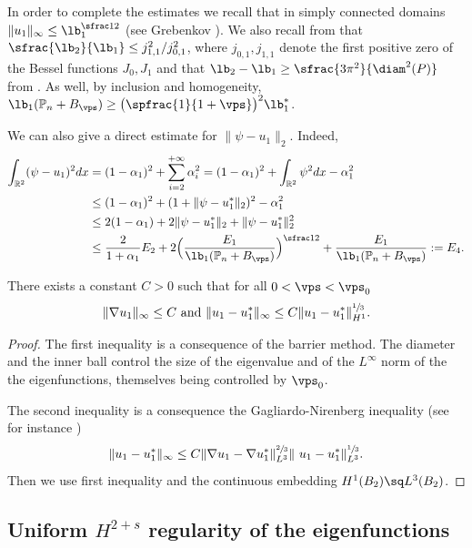 \begin{rem}
In order to complete the estimates we recall that in simply connected domains $\|u_1\|_\infty \le \lb_1^{\sfrac 12}$ (see Grebenkov \cite[For.\,(6.22)]{GrNg13}). We also recall from \cite{AsBe92} that $\sfrac{\lb_2 }{ \lb _1} \le j_{1,1}^2/j_{0,1}^2$, where $j_{0,1}, j_{1,1}$ denote the first positive zero of the Bessel functions $J_0, J_1$ and that $\lb_2-\lb_1\ge \sfrac{3\pi^2}{\diam^2 (P)}$ from \cite{AnCl11}.
As well, by inclusion and homogeneity, $\lb_1(\Bbb{P}_n+ B_\vps) \ge \big (\spfrac{1}{1+\vps} \big)^2 \lb_1^*$.

We can also give a direct estimate for $\|\psi -u_1 \|_2$. Indeed,
\begin{align*}
\int_{\Bbb{R}^2} (\psi -u_1)^2 dx &= (1-\alpha_1)^2+ \sum_{i=2}^{+\infty} \alpha_i^2= (1-\alpha_1)^2+ \int_{\Bbb{R}^2} \psi^2 dx -\alpha_1^2
\\
&\le (1-\alpha_1)^2+(1+ \|\psi -u_1^*\|_2)^2 -\alpha_1^2
\\
&\le 2(1-\alpha_1)+ 2 \|\psi -u_1^*\|_2 + \|\psi -u_1^*\|_2^2
\\
&\le \frac{2}{1+\alpha_1} E_2+ 2\Bigl(\frac{E_1}{\lb_1(\Bbb{P}_n+ B_\vps)}\Bigr)^{\sfrac12}+\frac{E_1}{\lb_1(\Bbb{P}_n+ B_\vps)}:=E_4.
\end{align*}
\end{rem}

\begin{propo}\label{bobu16}
There exists a constant $C>0$ such that for all $0<\vps<\vps _0$
\[
\|\nabla u_1\|_\infty \le C \text{ and }\|u_1-u_1^*\|_\infty \le C \|u_1-u_1^*\|_{H^1}^{\sfrac13}.
\]
\end{propo}
\begin{proof}
The first inequality is a consequence of the barrier method. The diameter and the inner ball control the size of the eigenvalue and of the $L^\infty$ norm of the the eigenfunctions, themselves being controlled by $\vps_0$.

The second inequality is a consequence the Gagliardo-Nirenberg inequality (see for instance \cite{Po20})
\[
\|u_1-u_1^*\|_\infty \le C \|\nabla u_1-\nabla u_1^*\|_{L^3}^{\sfrac 23} \|\ u_1-u_1^*\|_{L^3}^{\sfrac13}.
\]
Then we use first inequality and the continuous embedding $H^1(B_2) \sq L^3(B_2)$.
\end{proof}
\subsection{Uniform $H^{2+s}$ regularity of the eigenfunctions}

